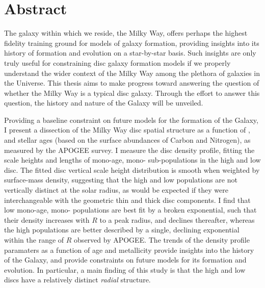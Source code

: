 \chapter*{Abstract}

The galaxy within which we reside, the Milky Way, offers perhaps the highest fidelity training ground for models of galaxy formation, providing insights into its history of formation and evolution on a star-by-star basis. Such insights are only truly useful for constraining disc galaxy formation models if we properly understand the wider context of the Milky Way among the plethora of galaxies in the Universe. This thesis aims to make progress toward answering the question of whether the Milky Way is a typical disc galaxy. Through the effort to answer this question, the history and nature of the Galaxy will be unveiled.

Providing a baseline constraint on future models for the formation of the Galaxy, I present a dissection of the Milky Way disc spatial structure as a function of \feh{}, \afe{} and stellar ages (based on the surface abundances of Carbon and Nitrogen), as measured by the APOGEE survey. I measure the disc density profile, fitting the scale heights and lengths of mono-age, mono-\feh{} sub-populations in the high and low \afe{} disc. The fitted disc vertical scale height distribution is smooth when weighted by surface-mass density, suggesting that the high and low \afe{} populations are not vertically distinct at the solar radius, as would be expected if they were interchangeable with the geometric thin and thick disc components. I find that low \afe{} mono-age, mono-\feh{} populations are best fit by a broken exponential, such that their density increases with $R$ to a peak radius, and declines thereafter, whereas the high \afe{} populations are better described by a single, declining exponential within the range of $R$ observed by APOGEE. The trends of the density profile paramaters as a function of age and metallicity provide insights into the history of the Galaxy, and provide constraints on future models for its formation and evolution. In particular, a main finding of this study is that the high and low \afe{} discs have a relatively distinct \emph{radial} structure.

